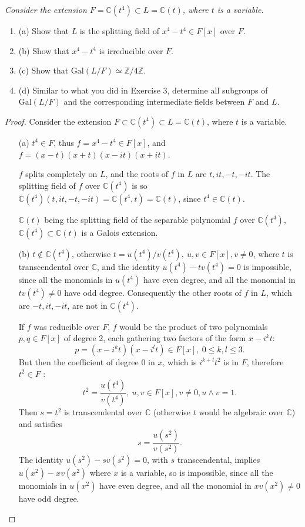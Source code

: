 \documentclass[11pt,a4paper]{article}
\newcommand{\be} {\begin{enumerate}}
\newcommand{\ee} {\end{enumerate}}
\newcommand{\Z}{\mathbb{Z}}
\newcommand{\C}{\mathbb{C}}
\newcommand{\Gal}{\mathrm{Gal}}
\begin{document}
{\it Consider the extension $F = \C(t^4) \subset L = \C(t)$, where $t$ is a variable.
\be
\item[(a)] Show that $L$ is the splitting field of $x^4-t^4 \in F[x]$ over $F$.
\item[(b)] Show that $x^4 -t^4$ is irreducible over $F$.
\item[(c)] Show that $\Gal(L/F) \simeq \Z/4\Z$.
\item[(d)] Similar to what you did in Exercise 3, determine all subgroups of $\Gal(L/F)$ and the corresponding intermediate fields between $F$ and $L$.
\ee
}

\begin{proof}
Consider the extension $F \subset \C(t^4) \subset L=\C(t)$, where $t$ is a variable.
\begin{enumerate}
\vspace{0.5cm}
\item[(a)]
$t^4 \in F$, thus $f=x^4 - t^4 \in F[x]$, and $f = (x-t)(x+t)(x-it)(x+it)$.

$f$ splits completely on $L$, and the roots of $f$ in $L$ are $t, it,-t,-it$. The splitting field of $f$  over $\C(t^4)$ is so $\C(t^4)(t,it,-t,-it) = \C(t^4,t) = \C(t)$, since $t^4 \in \C(t)$.

$\C(t)$ being the splitting field of the separable polynomial $f$ over $\C(t^4)$, $\C(t^4) \subset \C(t)$ is a Galois extension.

\item[(b)] $t  \not \in \C(t^4)$, otherwise $t = u(t^4)/v(t^4),\ u,v \in F[x], v\neq 0$, where $t$ is transcendental over $\C$, and the identity $u(t^4) - t v(t^4) = 0$ is impossible, since all the monomials in $u(t^4)$ have even degree, and all the monomial in $tv(t^4)\neq 0$ have odd degree.  Consequently the other roots of $f$ in  $L$, which are $-t,it,-it$,  are not in $\C(t^4)$.

If  $f$ was reducible over $F$, $f$ would be the product of two polynomials $p,q \in F[x]$ of degree 2, each gathering two factors of the form $x-i^k t$:
$$p = (x -i^k t)(x-i^l t) \in F[x], \ 0 \leq k,l \leq 3.$$
But then the coefficient of degree 0 in $x$, which is $i^{k+l} t^2$ is in $ F$, therefore $t^2 \in F$ :
$$t^2 = \frac{u(t^4)}{v(t^4)}, \ u,v \in F[x], v\neq 0, u\wedge v=1.$$
Then  $s = t^2$ is transcendental over $\C$ (otherwise $t$ would be algebraic over $\C$) and satisfies
$$s = \frac{u(s^2)}{v(s^2)}.$$
The identity $u(s^2) -sv(s^2) = 0$, with $s$ transcendental, implies $u(x^2) -x v(x^2)$ where $x$ is a variable, so is impossible, since all the monomials in $u(x^2)$ have even degree, and all the monomial in $xv(x^2)\neq 0$ have odd degree.


\end{enumerate}
\end{proof}
\end{document}
